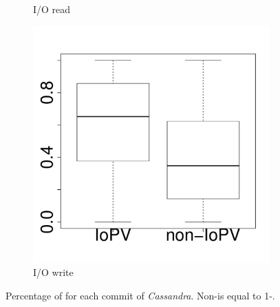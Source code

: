 \documentclass[10pt,journal,compsoc]{IEEEtran}
\begin{document}
\begin{figure}[t]
\begin{subfigure}{0.19\textwidth}
                \caption{I/O read}
        \end{subfigure}
        \begin{subfigure}{0.19\textwidth}
                \includegraphics[width=\linewidth]{Figures/iowrite-cassandra-boxplot.pdf}
                \caption{I/O write}
        \end{subfigure}
        
	\caption{Percentage of \inconsistent for each commit of \emph{Cassandra}.  Non-\inconsistent is equal to 1-\inconsistent.} %
	\label{fig:iopv_per_commit_cassandra}
\end{figure}
\end{document}
